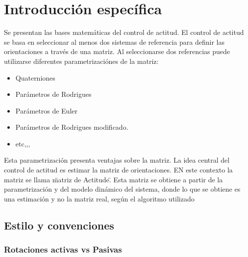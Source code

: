 \chapter{Introducción específica} %

\label{Chapter2}

Se presentan las bases matemáticas del control de actitud. El control de actitud se basa en seleccionar al menos dos sistemas de referencia para definir las orientaciones a través de una matriz. Al seleccionarse dos referencias puede utilizarse diferentes parametrizaciónes de la matriz: 
\begin{itemize}
	\item Quaterniones
	\item Parámetros de Rodrigues
	\item Parámetros de Euler
	\item Parámetros de Rodrigues modificado.
	\item etc,,, 
\end{itemize}
Esta parametrización presenta ventajas sobre la matriz. La idea central del control de actitud es estimar la matriz de orientaciones. EN este contexto la matriz se llama \"matriz de Actitude\". Esta matriz se obtiene a partir de la parametrización y del modelo dinámico del sistema, donde lo que se obtiene es una estimación y no la matriz real, según el algoritmo utilizado 
 

\section{Estilo y convenciones}
\label{sec:ejemplo}

\subsection{Rotaciones activas vs Pasivas}


